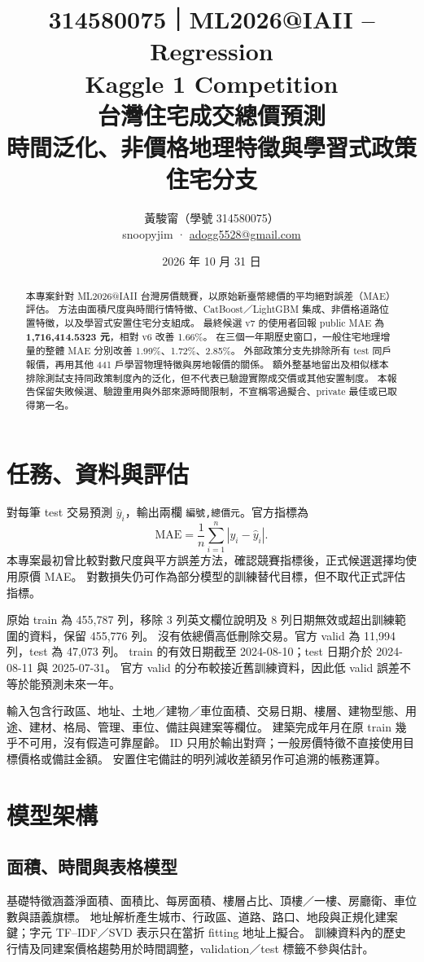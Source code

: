 \documentclass[11pt,a4paper]{article}
\title{314580075｜ML2026@IAII -- Regression\\Kaggle 1 Competition\\\large 台灣住宅成交總價預測\\時間泛化、非價格地理特徵與學習式政策住宅分支}
\author{黃駿甯（學號 314580075）\\\small snoopyjim · \href{mailto:adogg5528@gmail.com}{adogg5528@gmail.com}}
\date{2026 年 10 月 31 日}
\begin{document}
\maketitle
\begin{abstract}
本專案針對 ML2026@IAII 台灣房價競賽，以原始新臺幣總價的平均絕對誤差（MAE）評估。
方法由面積尺度與時間行情特徵、CatBoost／LightGBM 集成、非價格道路位置特徵，以及學習式安置住宅分支組成。
最終候選 v7 的使用者回報 public MAE 為 \textbf{1,716,414.5323 元}，相對 v6 改善 1.66\%。
在三個一年期歷史窗口，一般住宅地理增量的整體 MAE 分別改善 1.99\%、1.72\%、2.85\%。
外部政策分支先排除所有 test 同戶報價，再用其他 441 戶學習物理特徵與房地報價的關係。
額外整基地留出及相似樣本排除測試支持同政策制度內的泛化，但不代表已驗證實際成交價或其他安置制度。
本報告保留失敗候選、驗證重用與外部來源時間限制，不宣稱零過擬合、private 最佳或已取得第一名。
\end{abstract}

\section{任務、資料與評估}
對每筆 test 交易預測 \(\hat y_i\)，輸出兩欄 \texttt{編號,總價元}。官方指標為
\begin{equation}
\mathrm{MAE}=\frac{1}{n}\sum_{i=1}^{n}|y_i-\hat y_i|.
\end{equation}
本專案最初曾比較對數尺度與平方誤差方法，確認競賽指標後，正式候選選擇均使用原價 MAE。
對數損失仍可作為部分模型的訓練替代目標，但不取代正式評估指標。

原始 train 為 455,787 列，移除 3 列英文欄位說明及 8 列日期無效或超出訓練範圍的資料，保留 455,776 列。
沒有依總價高低刪除交易。官方 valid 為 11,994 列，test 為 47,073 列。
train 的有效日期截至 2024-08-10；test 日期介於 2024-08-11 與 2025-07-31。
官方 valid 的分布較接近舊訓練資料，因此低 valid 誤差不等於能預測未來一年。

輸入包含行政區、地址、土地／建物／車位面積、交易日期、樓層、建物型態、用途、建材、格局、管理、車位、備註與建案等欄位。
建築完成年月在原 train 幾乎不可用，沒有假造可靠屋齡。
ID 只用於輸出對齊；一般房價特徵不直接使用目標價格或備註金額。
安置住宅備註的明列減收差額另作可追溯的帳務運算。

\section{模型架構}
\subsection{面積、時間與表格模型}
基礎特徵涵蓋淨面積、面積比、每房面積、樓層占比、頂樓／一樓、房廳衛、車位數與語義旗標。
地址解析產生城市、行政區、道路、路口、地段與正規化建案鍵；字元 TF--IDF／SVD 表示只在當折 fitting 地址上擬合。
訓練資料內的歷史行情及同建案價格趨勢用於時間調整，validation／test 標籤不參與估計。
\end{document}
